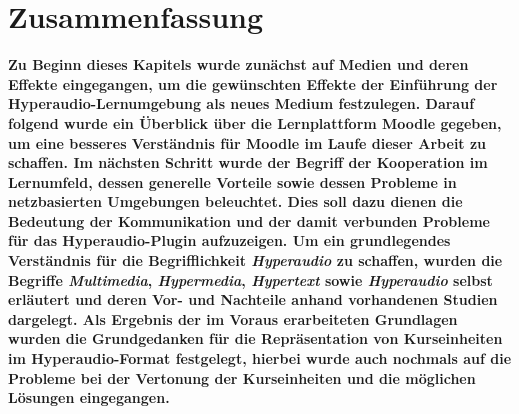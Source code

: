 \section{Zusammenfassung}
\textbf{Zu Beginn dieses Kapitels wurde zunächst auf Medien und deren Effekte eingegangen, um die gewünschten Effekte der Einführung der Hyperaudio-Lernumgebung als neues Medium festzulegen. Darauf folgend wurde ein Überblick über die Lernplattform Moodle gegeben, um eine besseres Verständnis für Moodle im Laufe dieser Arbeit zu schaffen. Im nächsten Schritt wurde der Begriff der Kooperation im Lernumfeld, dessen generelle Vorteile sowie dessen Probleme in netzbasierten Umgebungen beleuchtet.  Dies soll dazu dienen die Bedeutung der Kommunikation und der damit verbunden Probleme für das Hyperaudio-Plugin aufzuzeigen. Um ein grundlegendes Verständnis für die Begrifflichkeit \textit{Hyperaudio} zu schaffen, wurden die Begriffe \textit{Multimedia}, \textit{Hypermedia}, \textit{Hypertext} sowie \textit{Hyperaudio} selbst erläutert und deren Vor- und Nachteile anhand vorhandenen Studien dargelegt. Als Ergebnis der im Voraus erarbeiteten Grundlagen wurden die Grundgedanken für die Repräsentation von Kurseinheiten im Hyperaudio-Format festgelegt, hierbei wurde auch nochmals auf die Probleme bei der Vertonung der Kurseinheiten und die möglichen Lösungen eingegangen.}
